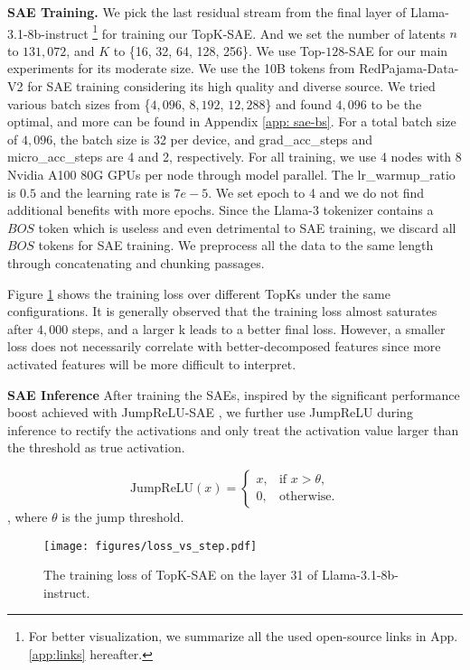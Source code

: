 \textbf{SAE Training.}
We pick the last residual stream from the final layer of Llama-3.1-8b-instruct \footnote{For better visualization, we summarize all the used open-source links in App. \ref{app:links} hereafter.} for training our TopK-SAE. And we set the number of latents $n$ to $131,072$,  and $K$ to \{16, 32, 64, 128, 256\}. We use Top-$128$-SAE for our main experiments for its moderate size. 
We use the 10B tokens from RedPajama-Data-V2 \citep{together2023redpajama} for SAE training considering its high quality and diverse source. We tried various batch sizes from \{$4,096$, $8,192$, $12,288$\} and found $4,096$ to be the optimal, and more can be found in Appendix \ref{app: sae-bs}. 
For a total batch size of $4,096$, the batch size is 32 per device, and grad\_acc\_steps and micro\_acc\_steps are 4 and 2, respectively.
For all training, we use 4 nodes with 8 Nvidia A100 80G GPUs per node through model parallel. The lr\_warmup\_ratio is $0.5$ and the learning rate is $7e-5$. 
We set epoch to 4 and we do not find additional benefits with more epochs. 
Since the Llama-3 tokenizer contains a $BOS$ token which is useless and even detrimental to SAE training, we discard all $BOS$ tokens for SAE training. We preprocess all the data to the same length through concatenating and chunking passages.

Figure \ref{fig: loss_sae31} shows the training loss over different TopKs under the same configurations. It is generally observed that the training loss almost saturates after $4,000$ steps, and a larger k leads to a better final loss. However, a smaller loss does not necessarily correlate with better-decomposed features since more activated features will be more difficult to interpret. 

\textbf{SAE Inference}
After training the SAEs, inspired by the significant performance boost achieved with JumpReLU-SAE \citep{rajamanoharan2024jumping}, we further use JumpReLU during inference to rectify the activations and only treat the activation value larger than the threshold as true activation. 

\begin{equation}
\text{JumpReLU}(x) =
\begin{cases} 
x, & \text{if } x > \theta, \\
0, & \text{otherwise.}
\end{cases}
\end{equation}
, where $\theta$ is the jump threshold.

\begin{figure}[ht]
\centering
\texttt{[image: figures/loss\_vs\_step.pdf]}
\caption{The training loss of TopK-SAE on the layer 31 of Llama-3.1-8b-instruct.}\label{fig: loss_sae31}
\end{figure} 

